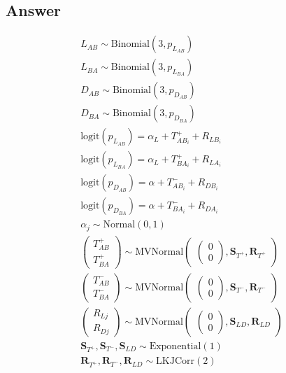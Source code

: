 \documentclass[
]{article}
\begin{document}
\hypertarget{answer-2}{%
\subsection{Answer}\label{answer-2}}

\[
\begin{aligned}
    L_{AB} \sim \text{Binomial}(3, p_{L_{AB}})\\
    L_{BA} \sim \text{Binomial}(3, p_{L_{BA}})\\
    D_{AB} \sim \text{Binomial}(3, p_{D_{AB}})\\
    D_{BA} \sim \text{Binomial}(3, p_{D_{BA}})\\
    \text{logit}(p_{L_{AB}}) = \alpha_L + T^+_{AB_i} + R_{LB_i}\\
    \text{logit}(p_{L_{BA}}) = \alpha_L + T^+_{BA_i} + R_{LA_i}\\
    \text{logit}(p_{D_{AB}}) = \alpha + T^-_{AB_i} + R_{DB_i}\\
    \text{logit}(p_{D_{BA}}) = \alpha + T^-_{BA_i} + R_{DA_i}\\
    \alpha_j \sim \text{Normal}(0,1)\\
    \begin{pmatrix}T^+_{AB}\\T^+_{BA}\end{pmatrix} \sim \text{MVNormal}\begin{pmatrix}\begin{pmatrix}0\\0\end{pmatrix}, \textbf{S}_{T^+}, \textbf{R}_{T^+}\end{pmatrix}\\
    \begin{pmatrix}T^-_{AB}\\T^-_{BA}\end{pmatrix} \sim \text{MVNormal}\begin{pmatrix}\begin{pmatrix}0\\0\end{pmatrix}, \textbf{S}_{T^-}, \textbf{R}_{T^-}\end{pmatrix}\\
    \begin{pmatrix}R_{Lj}\\R_{Dj}\end{pmatrix} \sim \text{MVNormal}\begin{pmatrix}\begin{pmatrix}0\\0\end{pmatrix}, \textbf{S}_{LD}, \textbf{R}_{LD}\end{pmatrix}\\
    \textbf{S}_{T^+}, \textbf{S}_{T^-}, \textbf{S}_{LD} \sim \text{Exponential}(1)\\
    \textbf{R}_{T^+}, \textbf{R}_{T^-}, \textbf{R}_{LD} \sim \text{LKJCorr}(2)
\end{aligned}
\]
\end{document}
